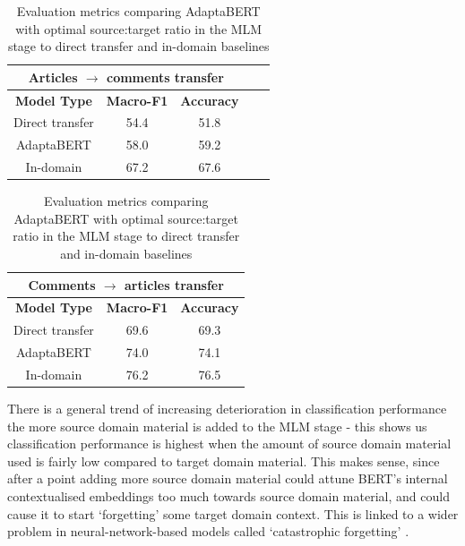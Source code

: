 \begin{table}[ht]
    \begin{center}
        \begin{tabular}{|c|c|c|c|c|}
            \hline
            \multicolumn{3}{|c|}{\textbf{Articles $ \rightarrow $ comments transfer}} \\
            \hline
            \textbf{Model Type} & \textbf{Macro-F1} & \textbf{Accuracy} \\
            \hline
            Direct transfer & 54.4 & 51.8  \\
            AdaptaBERT & 58.0 & 59.2 \\
            \hline
            In-domain & 67.2 & 67.6 \\
            \hline
        \end{tabular}
    \end{center} \vspace{10pt}
    \begin{center}
        \begin{tabular}{|c|c|c|}
            \hline
            \multicolumn{3}{|c|}{\textbf{Comments $ \rightarrow $ articles transfer}} \\
            \hline
            \textbf{Model Type} & \textbf{Macro-F1} & \textbf{Accuracy} \\
            \hline
            Direct transfer & 69.6 & 69.3  \\
            AdaptaBERT & 74.0 & 74.1 \\
            \hline
            In-domain & 76.2 & 76.5  \\
            \hline
        \end{tabular}
    \end{center}
    \caption{Evaluation metrics comparing AdaptaBERT with optimal source:target ratio in the MLM stage to direct transfer and in-domain baselines}
    \label{tab:adaptabert-results-best}
\end{table}

There is a general trend of increasing deterioration in classification performance the more source domain material is added to the MLM stage - this shows us classification performance is highest when the amount of source domain material used is fairly low compared to target domain material. This makes sense, since after a point adding more source domain material could attune BERT's internal contextualised embeddings too much towards source domain material, and could cause it to start `forgetting' some target domain context. This is linked to a wider problem in neural-network-based models called `catastrophic forgetting' \cite{catastrophic-forgetting}.


